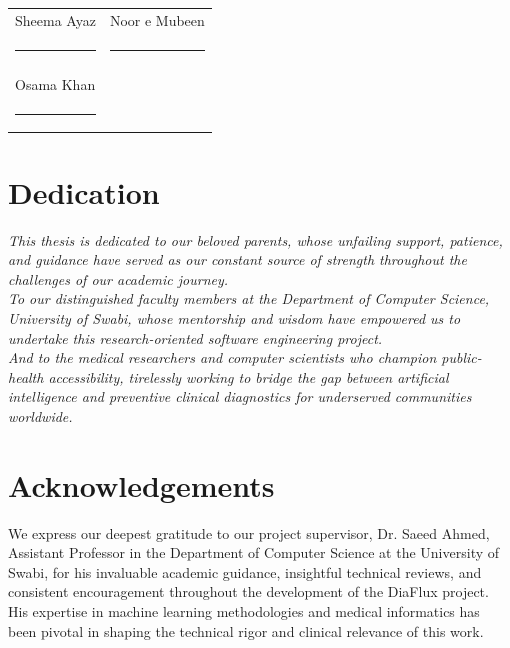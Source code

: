\documentclass[12pt,a4paper]{report}
\begin{document}
\vspace{2.5cm}
\noindent
\begin{tabular}{p{6cm}p{6cm}}
Sheema Ayaz & Noor e Mubeen \\
\rule{5cm}{0.4pt} & \rule{5cm}{0.4pt} \\
\\
Osama Khan & \\
\rule{5cm}{0.4pt} &
\end{tabular}

\clearpage

\chapter*{Dedication}
\begin{center}
    \vspace*{4cm}
    \textit{This thesis is dedicated to our beloved parents, whose unfailing support, patience, and guidance have served as our constant source of strength throughout the challenges of our academic journey.}\\

    \vspace{1cm}
    \textit{To our distinguished faculty members at the Department of Computer Science, University of Swabi, whose mentorship and wisdom have empowered us to undertake this research-oriented software engineering project.}\\

    \vspace{1.5cm}
    \textit{And to the medical researchers and computer scientists who champion public-health accessibility, tirelessly working to bridge the gap between artificial intelligence and preventive clinical diagnostics for underserved communities worldwide.}
\end{center}

\clearpage

\chapter*{Acknowledgements}
We express our deepest gratitude to our project supervisor, Dr. Saeed Ahmed, Assistant Professor in the Department of Computer Science at the University of Swabi, for his invaluable academic guidance, insightful technical reviews, and consistent encouragement throughout the development of the DiaFlux project. His expertise in machine learning methodologies and medical informatics has been pivotal in shaping the technical rigor and clinical relevance of this work.
\end{document}
